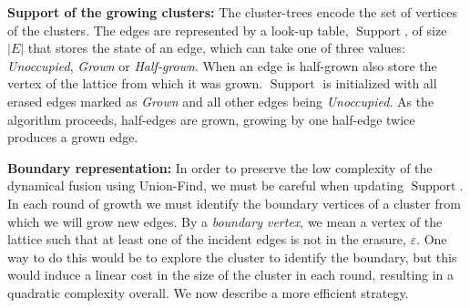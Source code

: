 \documentclass[a4paper, 10pt, accepted=2021-11-03]{quantumarticle}
\DeclareMathOperator{\Support}{Support}
\newcommand{\e}{\varepsilon}
\begin{document}
\medskip
{\bf Support of the growing clusters:}
The cluster-trees encode the set of vertices of the clusters.
The edges are represented by a look-up table, $\Support$, of size $|E|$
that stores the state of an edge, which can take one of 
three values: {\em Unoccupied}, {\em Grown} or {\em Half-grown}.
When an edge is half-grown also store the vertex of the lattice
from which it was grown.
$\Support$ is initialized with all erased edges marked as {\em Grown}
and all other edges being {\em Unoccupied}. As the algorithm proceeds, 
half-edges are grown, growing by one half-edge twice produces a grown edge. 



\medskip
{\bf Boundary representation:}
In order to preserve the low complexity of the dynamical fusion 
using Union-Find, we must be careful when updating $\Support$. In each round
of growth we must identify the boundary vertices of a cluster from which we will
grow new edges. By a {\em boundary vertex}, we mean a vertex of the lattice such that at least one of the
incident edges is not in the erasure, $\e$. One way to do this would be to explore the cluster to identify
the boundary, but this would induce a linear cost in the size of the cluster 
in each round, resulting in a quadratic complexity overall.
We now describe a more efficient strategy.
\end{document}
